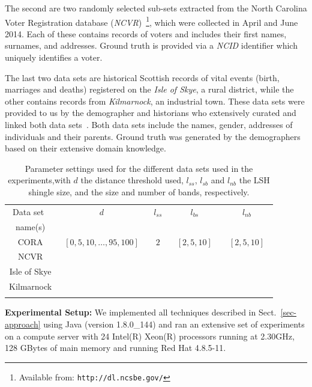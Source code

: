 \documentclass{llncs}
\begin{document}
The second are two randomly selected sub-sets extracted from the North Carolina Voter Registration
database (\emph{NCVR})~\footnote{Available from: \texttt{http://dl.ncsbe.gov/}}, which were collected in April and June
2014. Each of these contains records of voters and includes their
first names, surnames, and addresses. Ground truth is provided via a
\emph{NCID} identifier which uniquely identifies a voter.

The last two data sets are historical Scottish records of vital
events (birth, marriages and deaths) registered on the
\emph{Isle of Skye}, a rural district, while the other contains
records from \emph{Kilmarnock}, an industrial town. These data sets
were provided to us by the demographer and historians who extensively
curated and linked both data sets~\cite{reid2002,reid2006}. Both data
sets include the  names, gender, addresses of individuals and their
parents. Ground truth was generated by the demographers based on their
extensive domain knowledge.


\begin{table}[t]
\caption{Parameter settings used for the different data sets used in
   the experiments,with $d$ the distance threshold used, $l_{ss}$, $l_{sb}$ and $l_{nb}$ the LSH
   shingle size, and the size and number of bands, respectively.}
 \label{table-parameters}
  \centering
  \begin{scriptsize}
  \begin{tabular}{ccccc}
  \hline\noalign{\smallskip}
  Data set~ & $d$ & $l_{ss}$ & $l_{bs}$ & $l_{nb}$ \\
  name(s) & & & &  \\
  \noalign{\smallskip} \hline \noalign{\smallskip}
  CORA & ~$[0,5,10,\ldots,95,100]$~ & ~$2$~ &
    ~$[2,5,10]$~ & ~$[2,5,10]$~  \\
  NCVR  &  \\
  Isle of Skye &  \\
  Kilmarnock  &  \\
  \noalign{\smallskip} \hline
  \end{tabular}
  \end{scriptsize}
\end{table}

\smallskip
\textbf{Experimental Setup:}
%
We implemented all techniques described in Sect.~\ref{sec-approach}
using Java (version 1.8.0\_144) and ran an extensive set of experiments on
a compute server with 24 Intel(R) Xeon(R) processors running at 2.30GHz, 
128 GBytes of main memory and running Red Hat 4.8.5-11.
\end{document}
